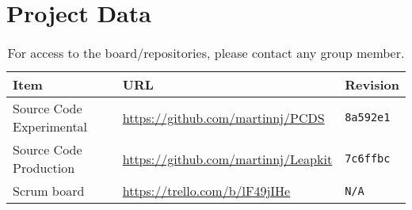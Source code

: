 \section{Project Data}

\begin{table}[h!]
    \begin{tabular}{l|l|l}
        \textbf{Item}            & \textbf{URL}                              & \textbf{Revision}\\\hline
        Source Code Experimental & \url{https://github.com/martinnj/PCDS}    & \texttt{8a592e1}\\
        Source Code Production   & \url{https://github.com/martinnj/Leapkit} & \texttt{7c6ffbc}\\
        Scrum board              & \url{https://trello.com/b/lF49jIHe}       & \texttt{N/A}
    \end{tabular}
    \label{tab:projdata}
    \caption{For access to the board/repositories, please contact any group member.}
\end{table}